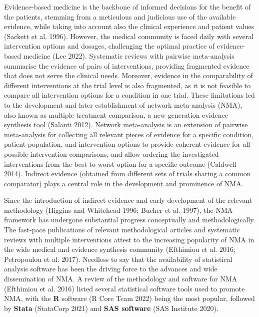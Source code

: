 Evidence-based medicine is the backbone of informed decisions for the benefit of
the patients, stemming from a meticulous and judicious use of the available evidence,
while taking into account also the clinical experience and patient values (Sackett et al. 1996).
However, the medical community is faced daily with several intervention options and
dosages, challenging the optimal practice of evidence-based medicine (Lee 2022).
Systematic reviews with pairwise meta-analysis summarise the evidence of pairs of
interventions, providing fragmented evidence that does not serve the clinical needs.
Moreover, evidence in the comparability of different interventions at the trial
level is also fragmented, as it is not feasible to compare all intervention options
for a condition in one trial. These limitations led to the development and later
establishment of network meta-analysis (NMA), also known as multiple treatment
comparison, a new generation evidence synthesis tool (Salanti 2012). Network
meta-analysis is an extension of pairwise meta-analysis for collecting all relevant
pieces of evidence for a specific condition, patient population, and intervention
options to provide coherent evidence for all possible intervention comparisons,
and allow ordering the investigated interventions from the best to worst option
for a specific outcome (Caldwell 2014). Indirect evidence (obtained from different
sets of trials sharing a common comparator) plays a central role in the development
and prominence of NMA.

Since the introduction of indirect evidence and early development of the relevant
methodology (Higgins and Whitehead 1996; Bucher et al. 1997), the NMA framework has undergone substantial
progress conceptually and methodologically. The fast-pace publications of relevant
methodological articles and systematic reviews with multiple interventions attest
to the increasing popularity of NMA in the wide medical and evidence synthesis
community (Efthimiou et al. 2016; Petropoulou et al. 2017). Needless to say that the availability
of statistical analysis software has been the driving force to the advances and
wide dissemination of NMA. A review of the methodology and software for NMA
(Efthimiou et al. 2016) listed several statistical software tools used to promote NMA, with
the \textbf{R} software (R Core Team 2022) being the most popular, followed by \textbf{Stata} (StataCorp 2021)
and \textbf{SAS software} (SAS Institute 2020).

